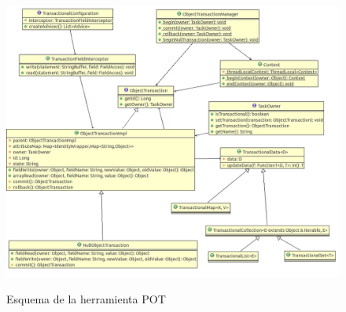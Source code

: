 	\begin{figure}[h]
		\includegraphics[scale=0.4]{img/pot}
	 	\label{fig:pot}
	 	\caption{Esquema de la herramienta POT}
	\end{figure}
